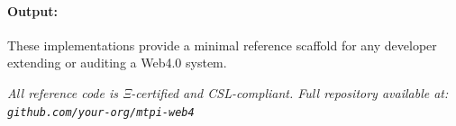 \documentclass[12]{amsart}
\theoremstyle{plain}
\begin{document}
\paragraph{Output:}
These implementations provide a minimal reference scaffold for any developer extending or auditing a Web4.0 system.

\bigskip

\noindent\textit{All reference code is Ξ-certified and CSL-compliant. Full repository available at: \texttt{github.com/your-org/mtpi-web4}}
\end{document}
